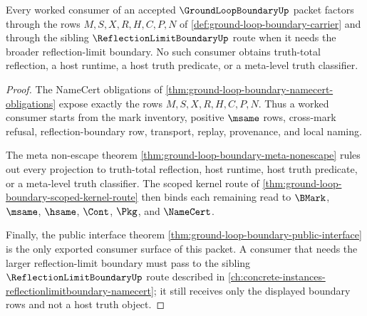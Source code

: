 \begin{theorem}
\label{thm:ground-loop-boundary-mature-consumer-exhaustion}
Every worked consumer of an accepted $\GroundLoopBoundaryUp$ packet factors through the rows $M,S,X,R,H,C,P,N$ of \autoref{def:ground-loop-boundary-carrier} and through the sibling $\ReflectionLimitBoundaryUp$ route when it needs the broader reflection-limit boundary. No such consumer obtains truth-total reflection, a host runtime, a host truth predicate, or a meta-level truth classifier.
\end{theorem}
\begin{proof}
The NameCert obligations of \autoref{thm:ground-loop-boundary-namecert-obligations} expose exactly the rows $M,S,X,R,H,C,P,N$. Thus a worked consumer starts from the mark inventory, positive $\msame$ rows, cross-mark refusal, reflection-boundary row, transport, replay, provenance, and local naming.

The meta non-escape theorem \autoref{thm:ground-loop-boundary-meta-nonescape} rules out every projection to truth-total reflection, host runtime, host truth predicate, or a meta-level truth classifier. The scoped kernel route of \autoref{thm:ground-loop-boundary-scoped-kernel-route} then binds each remaining read to $\BMark$, $\msame$, $\hsame$, $\Cont$, $\Pkg$, and $\NameCert$.

Finally, the public interface theorem \autoref{thm:ground-loop-boundary-public-interface} is the only exported consumer surface of this packet. A consumer that needs the larger reflection-limit boundary must pass to the sibling $\ReflectionLimitBoundaryUp$ route described in \autoref{ch:concrete-instances-reflectionlimitboundary-namecert}; it still receives only the displayed boundary rows and not a host truth object.
\end{proof}


